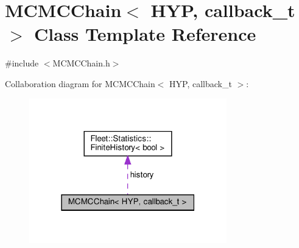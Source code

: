 \hypertarget{class_m_c_m_c_chain}{}\section{M\+C\+M\+C\+Chain$<$ H\+YP, callback\+\_\+t $>$ Class Template Reference}
\label{class_m_c_m_c_chain}


{\ttfamily \#include $<$M\+C\+M\+C\+Chain.\+h$>$}



Collaboration diagram for M\+C\+M\+C\+Chain$<$ H\+YP, callback\+\_\+t $>$\+:\nopagebreak
\begin{figure}[H]
\begin{center}
\leavevmode
\includegraphics[width=243pt]{class_m_c_m_c_chain__coll__graph}
\end{center}
\end{figure}
